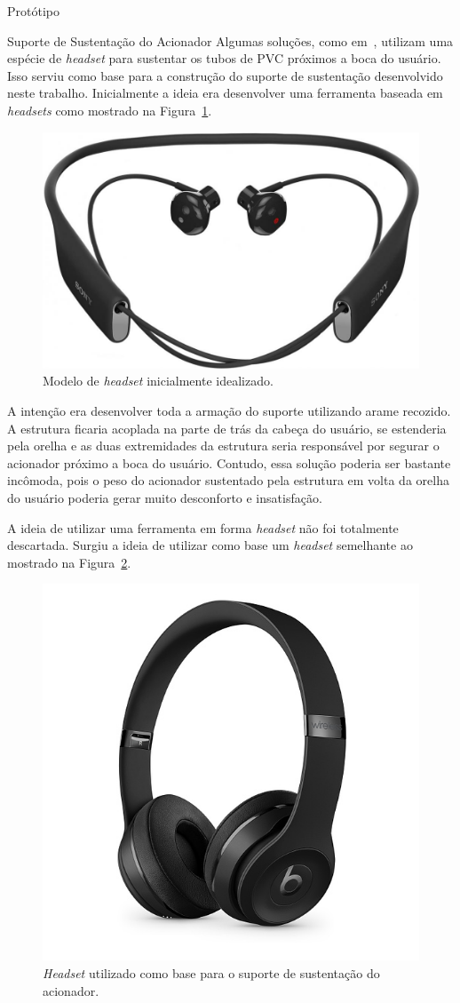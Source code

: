 \begin{chapter}{Protótipo}
\begin{section}{Suporte de Sustentação do Acionador}
Algumas soluções, como em~\cite{CorpPuff}, utilizam uma espécie de 
\textit{headset} para sustentar os tubos de PVC próximos a boca do usuário. Isso
serviu como base para a construção do suporte de sustentação desenvolvido neste
trabalho. Inicialmente a ideia era desenvolver uma ferramenta baseada em
\textit{headsets} como mostrado na Figura~\ref{fig:headset}.

\begin{figure}[!h]
	\centering
	\begin{minipage}[c]{\textwidth}
	\centering
	\includegraphics[width=0.4\linewidth]{fig/heaset}
	\caption{Modelo de \textit{headset} inicialmente idealizado.}
	\label{fig:headset}
	\end{minipage}
\end{figure} 

A intenção era desenvolver toda a armação do suporte utilizando arame recozido.
A estrutura ficaria acoplada na parte de trás da cabeça do usuário, se estenderia
pela orelha e as duas extremidades da estrutura seria responsável por segurar o
acionador próximo a boca do usuário. Contudo, essa solução poderia ser
bastante incômoda, pois o peso do acionador sustentado pela estrutura em volta
da orelha do usuário poderia gerar muito desconforto e insatisfação.

A ideia de utilizar uma ferramenta em forma \textit{headset} não foi totalmente
descartada. Surgiu a ideia de utilizar como base um \textit{headset} semelhante 
ao mostrado  na Figura~\ref{fig:fone}. 
 
\begin{figure}[!h]
	\centering
	\begin{minipage}[c]{\textwidth}
	\centering
	\includegraphics[width=0.4\linewidth]{fig/fone}
	\caption{\textit{Headset} utilizado como base para o suporte de sustentação
do acionador.}
	\label{fig:fone}
	\end{minipage}
\end{figure}



\end{section}
\end{chapter}
